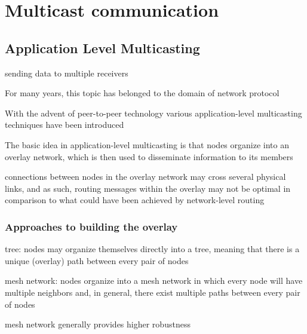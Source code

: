 \documentclass[ngerman,a4paper]{report}
\begin{document}
\section{Multicast communication}

\subsection{Application Level Multicasting}

\begin{compactitem}
	\item sending data to multiple receivers
	\item For many years, this topic has belonged to the domain of network protocol
	\item With the advent of peer-to-peer technology various application-level multicasting techniques have been introduced
	\item The basic idea in application-level multicasting is that nodes organize into an overlay network, which is then used to disseminate information to its members
	\item connections between nodes in the overlay network may cross several physical links, and as such, routing messages within the overlay may not be optimal in comparison to what could have been achieved by network-level routing
\end{compactitem} 


\subsubsection*{Approaches to building the overlay}
\begin{compactitem}
	\item tree: nodes may organize themselves directly into a tree, meaning that there is a unique (overlay) path between every pair of nodes
	\item mesh network: nodes organize into a mesh network in which every node will have multiple neighbors and, in general, there exist multiple paths between every pair of nodes
	\item mesh network generally provides higher robustness
\end{compactitem}

\
\end{document}
